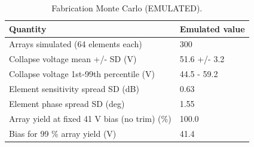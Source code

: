 \begin{table}
\caption{Fabrication Monte Carlo (EMULATED).}
\label{tab:T_E1_fabrication_mc}
\begin{tabular}{ll}
\toprule
Quantity & Emulated value \\
\midrule
Arrays simulated (64 elements each) & 300 \\
Collapse voltage mean +/- SD (V) & 51.6 +/- 3.2 \\
Collapse voltage 1st-99th percentile (V) & 44.5 - 59.2 \\
Element sensitivity spread SD (dB) & 0.63 \\
Element phase spread SD (deg) & 1.55 \\
Array yield at fixed 41 V bias (no trim) (\%) & 100.0 \\
Bias for 99 \% array yield (V) & 41.4 \\
\bottomrule
\end{tabular}
\end{table}
